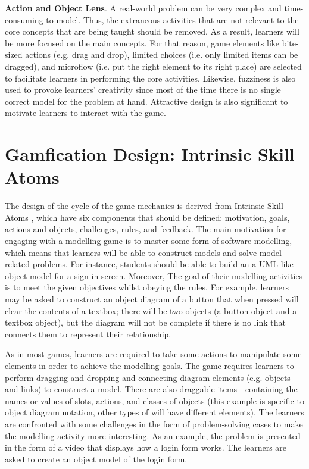 \documentclass[runningheads,a4paper]{llncs}
\begin{document}
\textbf{Action and Object Lens}. A real-world problem can be very complex and time-consuming to model. Thus, the extraneous activities that are not relevant to the core concepts that are being taught should be removed. As a result, learners will be more focused on the main concepts. For that reason, game elements like bite-sized actions (e.g. drag and drop), limited choices (i.e. only limited items can be dragged), and microflow (i.e. put the right element to its right place) are selected to facilitate learners in performing the core activities. Likewise, fuzziness is also used to provoke learners' creativity since most of the time there is no single correct model for the problem at hand. Attractive design is also significant to motivate learners to interact with the game.

\section{Gamfication Design: Intrinsic Skill Atoms}
The design of the cycle of the game mechanics is derived from Intrinsic Skill Atoms \cite{deterding2015lens}, which have six components that should be defined: motivation, goals, actions and objects, challenges, rules, and feedback. The main motivation for engaging with a modelling game is to master some form of software modelling, which means that learners will be able to construct models and solve model-related problems. For instance, students should be able to build an a UML-like object model for a sign-in screen. Moreover, The goal of their modelling activities is to meet the given objectives whilst obeying the rules. For example, learners may be asked to construct an object diagram of a button that when pressed will clear the contents of a textbox; there will be two objects (a button object and a textbox object), but the diagram will not be complete if there is no link that connects them to represent their relationship. 

As in most games, learners are required to take some actions to manipulate some elements in order to achieve the modelling goals. The game requires learners to perform dragging and dropping and connecting diagram elements (e.g. objects and links) to construct a model. There are also draggable items---containing the names or values of slots, actions, and classes of objects (this example is specific to object diagram notation, other types of will have different elements). The learners are confronted with some challenges in the form of problem-solving cases to make the modelling activity more interesting.  As an example, the problem is presented in the form of a video that displays how a login form works. The learners are asked to create an object model of the login form. 
\end{document}
